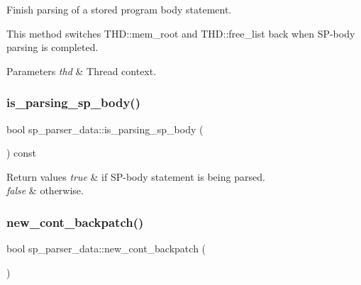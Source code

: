 Finish parsing of a stored program body statement.

This method switches T\+H\+D\+::mem\+\_\+root and T\+H\+D\+::free\+\_\+list back when SP-\/body parsing is completed.


\begin{DoxyParams}{Parameters}
{\em thd} & Thread context. \\
\hline
\end{DoxyParams}
\mbox{\label{classsp__parser__data_a699c459aa777584cb6596fe00d20cd88}} 
\subsubsection{\texorpdfstring{is\+\_\+parsing\+\_\+sp\+\_\+body()}{is\_parsing\_sp\_body()}}
{\footnotesize\ttfamily bool sp\+\_\+parser\+\_\+data\+::is\+\_\+parsing\+\_\+sp\+\_\+body (\begin{DoxyParamCaption}{ }\end{DoxyParamCaption}) const\hspace{0.3cm}{\ttfamily [inline]}}


\begin{DoxyRetVals}{Return values}
{\em true} & if SP-\/body statement is being parsed. \\
\hline
{\em false} & otherwise. \\
\hline
\end{DoxyRetVals}
\mbox{\label{classsp__parser__data_af658fd5aa0ce26b21268b34be0fd2c29}} 
\subsubsection{\texorpdfstring{new\+\_\+cont\+\_\+backpatch()}{new\_cont\_backpatch()}}
{\footnotesize\ttfamily bool sp\+\_\+parser\+\_\+data\+::new\+\_\+cont\+\_\+backpatch (\begin{DoxyParamCaption}{ }\end{DoxyParamCaption})\hspace{0.3cm}{\ttfamily [inline]}}

